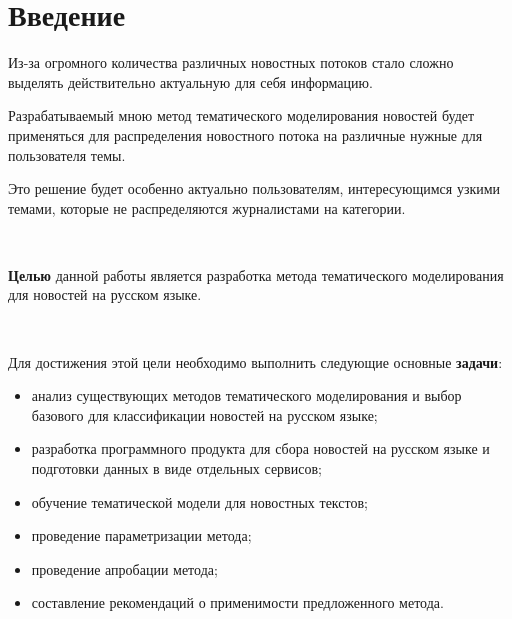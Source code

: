 \chapter*{Введение}

Из-за огромного количества различных новостных потоков стало сложно выделять действительно актуальную для себя информацию. 

Разрабатываемый мною метод тематического моделирования новостей будет применяться для распределения новостного потока на различные нужные для пользователя темы.

Это решение будет особенно актуально пользователям, интересующимся узкими темами, которые не распределяются журналистами на категории.

~\

\textbf{Целью} данной работы является разработка метода тематического моделирования для новостей на русском языке.

~\

Для достижения этой цели необходимо выполнить следующие основные \textbf{задачи}:

\begin{itemize}
    \item анализ существующих методов тематического моделирования и выбор базового для классификации новостей на русском языке;
    \item разработка программного продукта для сбора новостей на русском языке и подготовки данных в виде отдельных сервисов;
    \item обучение тематической модели для новостных текстов;
    \item проведение параметризации метода;
    \item проведение апробации метода;
    \item составление рекомендаций о применимости предложенного метода.
\end{itemize}


